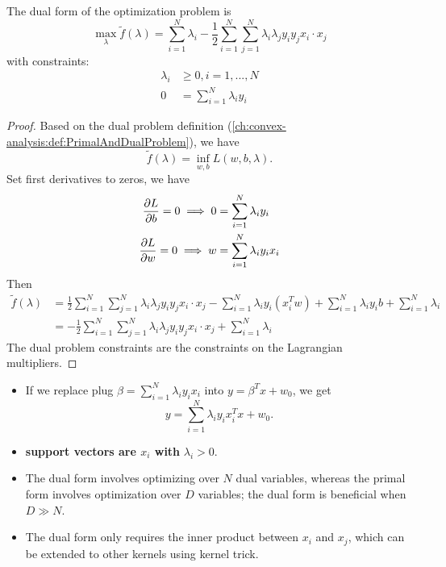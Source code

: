 \begin{refsection}
\begin{theorem}
	The dual form of the optimization problem is
	$$\max_{\lambda} \tilde{f}(\lambda) = \sum_{i=1}^N \lambda_i - \frac{1}{2}\sum_{i=1}^N\sum_{j=1}^N \lambda_i\lambda_j y_iy_j x_i\cdot x_j$$
	with constraints:
	\begin{align*}
	\lambda_i &\geq 0, i = 1,...,N\\
	0 &= \sum_{i=1}^N \lambda_iy_i
	\end{align*}
\end{theorem}
\begin{proof}
Based on the dual problem definition (\autoref{ch:convex-analysis:def:PrimalAndDualProblem}), we have
$$\tilde{f}(\lambda) = \inf_{w,b} L(w,b,\lambda).$$
Set first derivatives to zeros, we have
	\begin{align*}
\frac{\partial L}{\partial b} = 0 \implies 0 &= \sum_{i=1}^N \lambda_iy_i\\
\frac{\partial L}{\partial w} = 0 \implies w &= \sum_{i=1}^N \lambda_iy_ix_i
\end{align*}
Then
\begin{align*}
\tilde{f}(\lambda) &=\frac{1}{2}\sum_{i=1}^N\sum_{j=1}^N \lambda_i\lambda_j y_iy_j x_i\cdot x_j - \sum_{i=1}^N \lambda_i y_i(x_i^Tw)  + \sum_{i=1}^N \lambda_iy_ib + \sum_{i=1}^N \lambda_i\\
&= -\frac{1}{2}\sum_{i=1}^N\sum_{j=1}^N \lambda_i\lambda_j y_iy_j x_i\cdot x_j + \sum_{i=1}^N \lambda_i
\end{align*}
The dual problem constraints are the constraints on the Lagrangian multipliers. 
\end{proof}


\begin{remark}
	\begin{itemize}
		\item If we replace plug $\beta = \sum_{i=1}^N \lambda_iy_ix_i$ into $y = \beta^Tx + w_0$, we get
		$$y = \sum_{i=1}^N \lambda_i y_ix_i^T x + w_0.$$
		\item \textbf{support vectors are $x_i$ with} $\lambda_i > 0$.
	\end{itemize}
\end{remark}



\begin{remark}\hfill
	\begin{itemize}
		\item The dual form involves optimizing over $N$ dual variables, whereas the primal form involves optimization over $D$ variables; the dual form is beneficial when $D\gg N$.
		\item The dual form only requires the inner product between $x_i$ and $x_j$, which can be extended to other kernels using kernel trick.
	\end{itemize}	
\end{remark}


\end{refsection}
